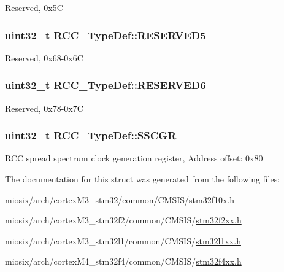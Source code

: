 Reserved, 0x5\-C \hypertarget{struct_r_c_c___type_def_a23df86f2945cf835b75e68692cb3824a}{
\subsubsection[{R\-E\-S\-E\-R\-V\-E\-D5}]{\setlength{\rightskip}{0pt plus 5cm}uint32\-\_\-t R\-C\-C\-\_\-\-Type\-Def\-::\-R\-E\-S\-E\-R\-V\-E\-D5}}\label{struct_r_c_c___type_def_a23df86f2945cf835b75e68692cb3824a}
Reserved, 0x68-\/0x6\-C \hypertarget{struct_r_c_c___type_def_a994d41086ec8435d0dccf055e410b141}{
\subsubsection[{R\-E\-S\-E\-R\-V\-E\-D6}]{\setlength{\rightskip}{0pt plus 5cm}uint32\-\_\-t R\-C\-C\-\_\-\-Type\-Def\-::\-R\-E\-S\-E\-R\-V\-E\-D6}}\label{struct_r_c_c___type_def_a994d41086ec8435d0dccf055e410b141}
Reserved, 0x78-\/0x7\-C \hypertarget{struct_r_c_c___type_def_a52270ad1423c68cd536f62657bb669f5}{
\subsubsection[{S\-S\-C\-G\-R}]{ uint32\-\_\-t R\-C\-C\-\_\-\-Type\-Def\-::\-S\-S\-C\-G\-R}}\label{struct_r_c_c___type_def_a52270ad1423c68cd536f62657bb669f5}
R\-C\-C spread spectrum clock generation register, Address offset\-: 0x80 

The documentation for this struct was generated from the following files\-:\begin{DoxyCompactItemize}
\item 
miosix/arch/cortex\-M3\-\_\-stm32/common/\-C\-M\-S\-I\-S/\hyperlink{stm32f10x_8h}{stm32f10x.\-h}\item 
miosix/arch/cortex\-M3\-\_\-stm32f2/common/\-C\-M\-S\-I\-S/\hyperlink{stm32f2xx_8h}{stm32f2xx.\-h}\item 
miosix/arch/cortex\-M3\-\_\-stm32l1/common/\-C\-M\-S\-I\-S/\hyperlink{stm32l1xx_8h}{stm32l1xx.\-h}\item 
miosix/arch/cortex\-M4\-\_\-stm32f4/common/\-C\-M\-S\-I\-S/\hyperlink{stm32f4xx_8h}{stm32f4xx.\-h}\end{DoxyCompactItemize}
